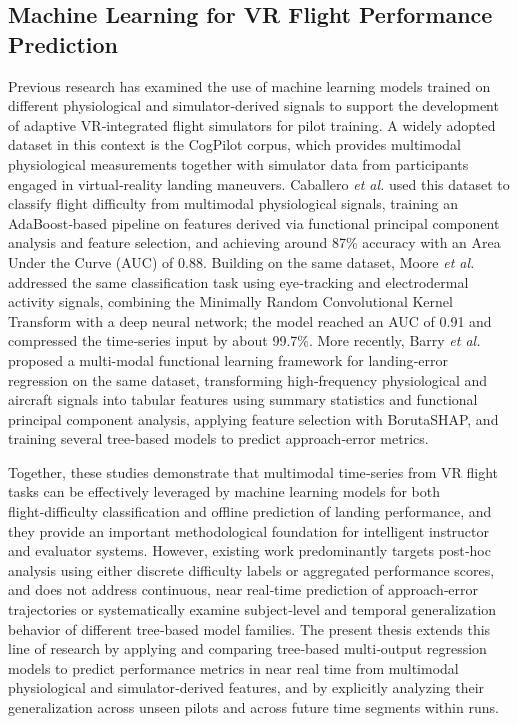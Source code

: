 \documentclass[11pt, a4paper]{article}
\begin{document}
\subsection{Machine Learning for VR Flight Performance Prediction}
Previous research has examined the use of machine learning models trained on different physiological and simulator‑derived signals to support the development of adaptive VR‑integrated flight simulators for pilot training. A widely adopted dataset in this context is the CogPilot \cite{rao-2022} corpus, which provides multimodal physiological measurements together with simulator data from participants engaged in virtual‑reality landing maneuvers. Caballero \emph{et al.} \cite{caballero-2023} used this dataset to classify flight difficulty from multimodal physiological signals, training an AdaBoost‑based pipeline on features derived via functional principal component analysis and feature selection, and achieving around 87\% accuracy with an Area Under the Curve (AUC) of 0.88. Building on the same dataset, Moore \emph{et al.} \cite{moore-2023} addressed the same classification task using eye‑tracking and electrodermal activity signals, combining the Minimally Random Convolutional Kernel Transform with a deep neural network; the model reached an AUC of 0.91 and compressed the time‑series input by about 99.7\%. More recently, Barry \emph{et al.} \cite{barry-2025} proposed a multi-modal functional learning framework for landing‑error regression on the same dataset, transforming high‑frequency physiological and aircraft signals into tabular features using summary statistics and functional principal component analysis, applying feature selection with BorutaSHAP, and training several tree‑based models to predict approach‑error metrics.

Together, these studies demonstrate that multimodal time‑series from VR flight tasks can be effectively leveraged by machine learning models for both flight‑difficulty classification and offline prediction of landing performance, and they provide an important methodological foundation for intelligent instructor and evaluator systems. However, existing work predominantly targets post‑hoc analysis using either discrete difficulty labels or aggregated performance scores, and does not address continuous, near real‑time prediction of approach‑error trajectories or systematically examine subject‑level and temporal generalization behavior of different tree‑based model families. The present thesis extends this line of research by applying and comparing tree‑based multi‑output regression models to predict performance metrics in near real time from multimodal physiological and simulator‑derived features, and by explicitly analyzing their generalization across unseen pilots and across future time segments within runs.
\end{document}
